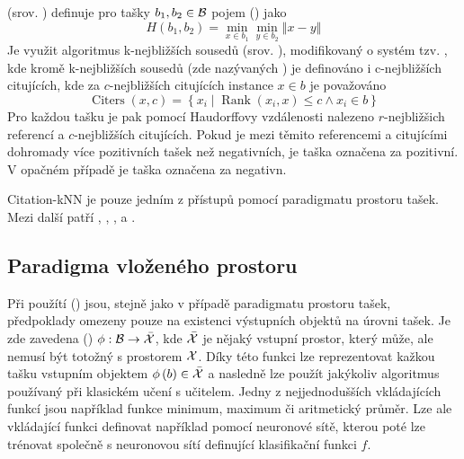  (srov. \cite{wang_solving_2000}) definuje pro tašky \( b_1, b_2 \in \mathcal B \) pojem  () jako
\[ H \left( b_1, b_2 \right) = \min_{x \in b_1} \min_{y \in b_2} \left\Vert x - y \right\Vert \]
Je využit algoritmus k-nejbližších sousedů (srov. \cite{dasarathy_nearest_1991}), modifikovaný o systém tzv. , kde kromě k-nejbližších sousedů (zde nazývaných ) je definováno i c-nejbližších citujících, kde za \( c \)-nejbližších citujících instance \( x \in b \) je považováno
\[ \operatorname{Citers} \left( x, c \right) = \left\{ x_i \middle| \operatorname{Rank} \left( x_i, x \right) \leq c \land x_i \in b \right\} \]
Pro každou tašku je pak pomocí Haudorffovy vzdálenosti nalezeno \( r \)-nejbližšich referencí a \( c \)-nejbližších citujících. Pokud je mezi těmito referencemi a citujícími dohromady více pozitivních tašek než negativních, je taška označena za pozitivní. V opačném případě je taška označena za negativn.

Citation-kNN je pouze jedním z přístupů pomocí paradigmatu prostoru tašek. Mezi další patří \cite{wang_solving_2000}, \cite{kwok_marginalized_2007}, \cite{gartner_multi-instance_2002}, \cite{haussler_convolution_1999} a \cite{muandet_learning_2012}.

\subsection{Paradigma vloženého prostoru}\label{embedded-space-paradigm}

Při použítí  () jsou, stejně jako v případě paradigmatu prostoru tašek, předpoklady omezeny pouze na existenci výstupních objektů na úrovni tašek. Je zde zavedena  () \( \phi : \mathcal B \to \bar{\mathcal X} \), kde \( \bar{\mathcal X} \) je nějaký vstupní prostor, který může, ale nemusí být totožný s prostorem \( \mathcal X \). Díky této funkci lze reprezentovat kažkou tašku vstupním objektem \( \phi \left( b \right) \in \bar{\mathcal X} \) a nasledně lze použít jakýkoliv algoritmus používaný při klasickém učení s učitelem. Jedny z nejjednodušších vkládajících funkcí jsou například funkce minimum, maximum či aritmetický průměr. Lze ale vkládající funkci definovat například pomocí neuronové sítě, kterou poté lze trénovat společně s neuronovou sítí definující klasifikační funkci \( f \).

